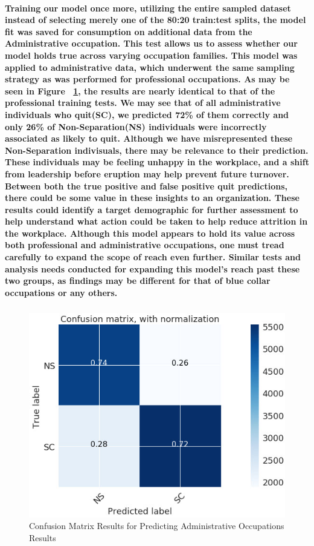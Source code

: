 \documentclass{article}
\begin{document}
\paragraph{Training our model once more, utilizing the entire sampled dataset instead of selecting merely one of the 80:20 train:test splits, the model fit was saved for consumption on additional data from the Administrative occupation. This test allows us to assess whether our model holds true across varying occupation families. This model was applied to administrative data, which underwent the same sampling strategy as was performed for professional occupations. As may be seen in Figure ~\ref{fig:AdminLRConfus}, the results are nearly identical to that of the professional training tests. We may see that of all administrative individuals who quit(SC),  we predicted 72\% of them correctly and only 26\% of Non-Separation(NS) individuals were incorrectly associated as likely to quit. Although we have misrepresented these Non-Separation indivisuals, there may be relevance to their prediction. These individuals may be feeling unhappy in the workplace, and a shift from leadership before eruption may help prevent future turnover. Between both the true positive and false positive quit predictions, there could be some value in these insights to an organization. These results could identify a target demographic for further assessment to help understand what action could be taken to help reduce attrition in the workplace. Although this model appears to hold its value across both professional and administrative occupations, one must tread carefully to expand the scope of reach even further. Similar tests and analysis needs conducted for expanding this model's reach past these two groups, as findings may be different for that of blue collar occupations or any others.}

\subparagraph{}
\begin{figure}[H]
\centering
\includegraphics[width=\linewidth]{AdminLRConfus.jpg}
\caption{Confusion Matrix Results for Predicting Administrative Occupations Results}
\label{fig:AdminLRConfus}
\end{figure}
\end{document}
